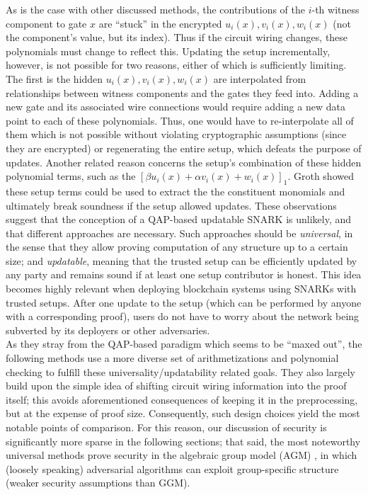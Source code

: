 \noindent As is the case with other discussed methods, the contributions of the $i$-th witness component to gate $x$ are ``stuck'' in the encrypted $u_i(x), v_i(x), w_i(x)$ (not the component's value, but its index). Thus if the circuit wiring changes, these polynomials must change to reflect this. Updating the setup incrementally, however, is not possible for two reasons, either of which is sufficiently limiting. The first is the hidden $u_i(x), v_i(x), w_i(x)$ are interpolated from relationships between witness components and the gates they feed into. Adding a new gate and its associated wire connections would require adding a new data point to each of these polynomials. Thus, one would have to re-interpolate all of them which is not possible without violating cryptographic assumptions (since they are encrypted) or regenerating the entire setup, which defeats the purpose of updates. Another related reason concerns the setup's combination of these hidden polynomial terms, such as the $[\beta u_i(x) + \alpha v_i(x) + w_i(x)]_1$. Groth \cite{grothupdatable} showed these setup terms could be used to extract the the constituent monomials and ultimately break soundness if the setup allowed updates. These observations suggest that the conception of a QAP-based updatable SNARK is unlikely, and that different approaches are necessary. Such approaches should be \textit{universal}, in the sense that they allow proving computation of any structure up to a certain size; and \textit{updatable}, meaning that the trusted setup can be efficiently updated by any party and remains sound if at least one setup contributor is honest. This idea becomes highly relevant when deploying blockchain systems using SNARKs with trusted setups. After one update to the setup (which can be performed by anyone with a corresponding proof), users do not have to worry about the network being subverted by its deployers or other adversaries. \\

\noindent As they stray from the QAP-based paradigm which seems to be ``maxed out'', the following methods use a more diverse set of arithmetizations and polynomial checking to fulfill these universality/updatability related goals. They also largely build upon the simple idea of shifting circuit wiring information into the proof itself; this avoids aforementioned consequences of keeping it in the preprocessing, but at the expense of proof size. Consequently, such design choices yield the most notable points of comparison. For this reason, our discussion of security is significantly more sparse in the following sections; that said, the most noteworthy universal methods prove security in the algebraic group model (AGM) \cite{agm}, in which (loosely speaking) adversarial algorithms can exploit group-specific structure (weaker security assumptions than GGM). \\

